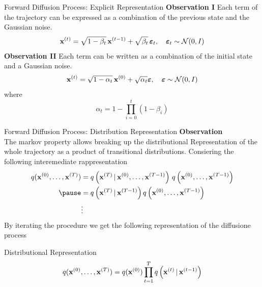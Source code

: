 \documentclass[aspectratio=169, 9pt]{beamer}
\theoremstyle{definition}
\begin{document}
\begin{frame}{Forward Diffusion Process: Explicit Representation}
  \textbf{Observation I}
  Each term of the trajectory can be expressed as a combination of the
  previous state and the Gaussian noise.
  \[
    \mathbf{x}^{(t)}=\sqrt{1-\beta_t}\,\mathbf{x}^{(t-1)} +
    \sqrt{\beta_t}\,{\boldsymbol{\varepsilon}}_t,\quad
    {\boldsymbol{\varepsilon}}_t\sim\mathcal{N}(0,I)
  \]
  \vspace{0.5cm}
  \textbf{Observation II}
  Each term can be written as a combination of the initial state and a
  Gaussian noise.
    \[
      \mathbf{x}^{(t)} = \sqrt{1-\alpha_t}\, \mathbf{x}^{(0)} + \sqrt{\alpha_t}
      {\boldsymbol{\varepsilon}},\quad {\boldsymbol{\varepsilon}}\sim\mathcal{N}(0,I)
    \]
    where
    \[
      \alpha_t = 1-\prod_{i=0}^t(1-\beta_i)
    \]
\end{frame}
\begin{frame}{Forward Diffusion Process: Distribution Representation}
  \textbf{Observation}\\
   The markov property allows breaking up the distributional
   Representation of the whole trajectory as a product of transitional
   distributions. Consiering the following interemediate rappresentation
  \begin{equation}
    \begin{aligned}
    q(\xx^{(0)},\ldots,\xx^{(T)}) &= q\left( \xx^{(T)}\,|\,
      \xx^{(0)},\ldots,\xx^{(T-1)} \right)\,q\left(
      \xx^{(0)},\ldots,\xx^{(T-1)} \right)\\
      \pause
      &= q\left(\xx^{(T)}\,\vert\, \xx^{(T-1)}\right) q\left(
      \xx^{(0)},\ldots,\xx^{(T-1)} \right)\\
      &\vdots\\
    \end{aligned}
  \end{equation}
  By iterating the procedure we get the following representation of the
  diffusione process
  \pause
  \begin{block}{Distributional Representation}
    \[
      q(\mathbf{x}^{(0)},\ldots,\mathbf{x}^{(T)})= q(\mathbf{x}^{(0)})\prod_{t=1}^T q\left(
          \mathbf{x}^{(t)}\,\vert\,\mathbf{x}^{(t-1)}
        \right)
    \]
  \end{block}
\end{frame}
\end{document}
